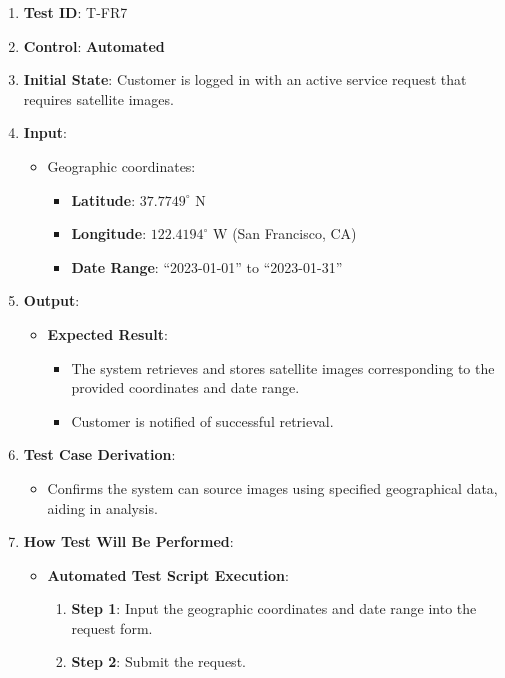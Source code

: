\documentclass[12pt, titlepage]{article}
\begin{document}
\begin{enumerate}
    \item \textbf{Test ID}: T-FR7
    \item \textbf{Control}: \textbf{Automated}
    \item \textbf{Initial State}: Customer is logged in with an active service request that requires satellite images.
    \item \textbf{Input}:
    \begin{itemize}
        \item Geographic coordinates:
        \begin{itemize}
            \item \textbf{Latitude}: $37.7749^\circ$ N
            \item \textbf{Longitude}: $122.4194^\circ$ W (San Francisco, CA)
            \item \textbf{Date Range}: ``2023-01-01'' to ``2023-01-31''
        \end{itemize}
    \end{itemize}
    \item \textbf{Output}:
    \begin{itemize}
        \item \textbf{Expected Result}:
        \begin{itemize}
            \item The system retrieves and stores satellite images corresponding to the provided coordinates and date range.
            \item Customer is notified of successful retrieval.
        \end{itemize}
    \end{itemize}
    \item \textbf{Test Case Derivation}:
    \begin{itemize}
        \item Confirms the system can source images using specified geographical data, aiding in analysis.
    \end{itemize}
    \item \textbf{How Test Will Be Performed}:
    \begin{itemize}
        \item \textbf{Automated Test Script Execution}:
        \begin{enumerate}
            \item \textbf{Step 1}: Input the geographic coordinates and date range into the request form.
            \item \textbf{Step 2}: Submit the request.

\end{enumerate}
\end{itemize}
\end{enumerate}
\end{document}
